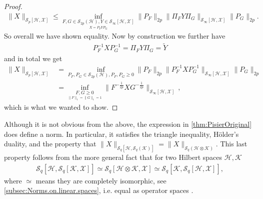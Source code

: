 \documentclass[11pt]{article}
\newcommand{\jk}[1]{\textcolor{cyan}{JK:~#1}}
\newcommand{\1}{\ensuremath{\mathbbm{1}}}
\theoremstyle{newdefinition}
\theoremstyle{newplain}
\theoremstyle{myplain}
\begin{document}
\begin{proof}
\begin{align}
     \|X\|_{\mathcal{S}_p[\mathcal{H},\mathcal{X}]} \leq
    \inf_{\underset{  X=P_FYP_G}{F,G\in \mathcal{S}_{2p}(\mathcal{H}), Y\in \mathcal{S}_\infty[\mathcal{H},\mathcal{X}]}}\|P_F\|_{2p}\|\Pi_FY\Pi_G\|_{\mathcal{S}_\infty[\mathcal{H},\mathcal{X}]}\|P_G\|_{2p}.
\end{align}
So overall we have shown equality. Now by construction we further have
\begin{align}
  P_F^{-1}XP_G^{-1} = \Pi_FY\Pi_G=\tilde{Y} 
\end{align} and in total we get
\begin{align}
   \|X\|_{\mathcal{S}_p[\mathcal{H},\mathcal{X}]} &= \inf_{P_F,P_G\in \mathcal{S}_{2p}(\mathcal{H}), P_F,P_G\geq 0}\|P_F\|_{2p}\|P_F^{-1}XP_G^{-1}\|_{\mathcal{S}_\infty[\mathcal{H},\mathcal{X}]}\|P_G\|_{2p} \\
&=\inf_{\underset{\|F\|_1=\|G\|_1=1}{F,G\ge 0}}\|F^{-\frac{1}{2p}}XG^{-\frac{1}{2p}}\|_{\mathcal{S}_\infty[\mathcal{H},\mathcal{X}]}\,,
\end{align} which is what we wanted to show.
\end{proof}

Although it is not obvious from the above, the expression in \cref{thm:PisierOriginal} does define a norm. In particular, it satisfies the triangle inequality, H\"{o}lder's duality, and the property that $\|X\|_{\mathcal{S}_q[\mathcal{H},\mathcal{S}_q(\mathcal{K})]}=\|X\|_{\mathcal{S}_q(\mathcal{H}\otimes \mathcal{K})}$.
This last property follows from the more general fact that for two Hilbert spaces $\mathcal{H}, \mathcal{K}$
\begin{align} \label{equ:combining.spaces}
\mathcal{S}_q[\mathcal{H},\mathcal{S}_q[\mathcal{K},\mathcal{X}]] \simeq \mathcal{S}_q[\mathcal{H}\otimes\mathcal{K},\mathcal{X}]\simeq \mathcal{S}_q[\mathcal{K},\mathcal{S}_q[\mathcal{H},\mathcal{X}]], \end{align} where $\simeq$ means they are completely isomorphic, see \cref{subsec:Norms.on.linear.spaces}, i.e. equal as operator spaces \cite[Theorem 1.9]{Book.Pisier.1998}.
\end{document}
